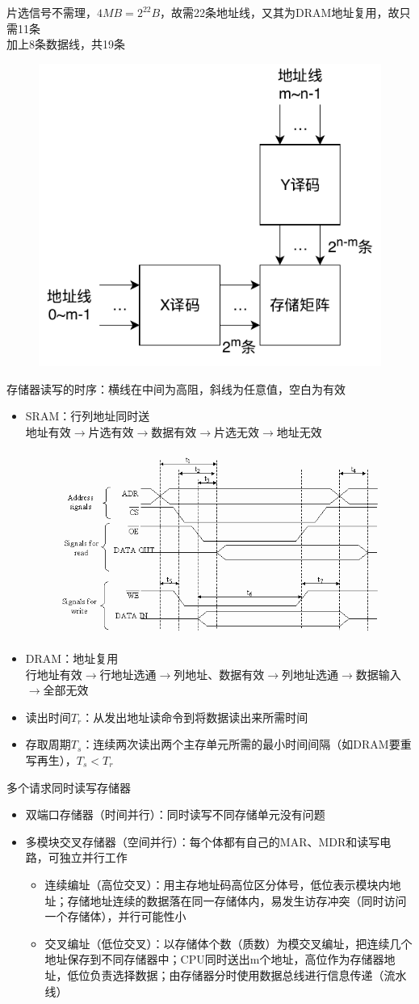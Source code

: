 \begin{analysis}
片选信号不需理，$4MB=2^{22}B$，故需22条地址线，又其为DRAM地址复用，故只需11条\\
加上8条数据线，共19条
\end{analysis}
\begin{figure}[H]
\centering
\includegraphics[width=0.4\linewidth]{fig/Memory-Double_Decode.pdf}
\end{figure}
存储器读写的时序：横线在中间为高阻，斜线为任意值，空白为有效
\begin{itemize}
	\item SRAM：行列地址同时送\\
	地址有效$\to$片选有效$\to$数据有效$\to$片选无效$\to$地址无效
	\begin{figure}[H]
	\centering
	\includegraphics[width=0.4\linewidth]{fig/sram_cycle.png}
	\end{figure}
	\item DRAM：地址复用\\
	行地址有效$\to$行地址选通$\to$列地址、数据有效$\to$列地址选通$\to$数据输入$\to$全部无效
\end{itemize}
\begin{itemize}
	\item 读出时间$T_r$：从发出地址读命令到将数据读出来所需时间
	\item 存取周期$T_s$：连续两次读出两个主存单元所需的最小时间间隔（如DRAM要重写再生），$T_s<T_r$
\end{itemize}
多个请求同时读写存储器
\begin{itemize}
	\item 双端口存储器（时间并行）：同时读写不同存储单元没有问题
	\item 多模块交叉存储器（空间并行）：每个体都有自己的MAR、MDR和读写电路，可独立并行工作
	\begin{itemize}
		\item 连续编址（高位交叉）：用主存地址码高位区分体号，低位表示模块内地址；存储地址连续的数据落在同一存储体内，易发生访存冲突（同时访问一个存储体），并行可能性小
		\item 交叉编址（低位交叉）：以存储体个数（质数）为模交叉编址，把连续几个地址保存到不同存储器中；CPU同时送出m个地址，高位作为存储器地址，低位负责选择数据；由存储器分时使用数据总线进行信息传递（流水线）
	\end{itemize}
\end{itemize}
